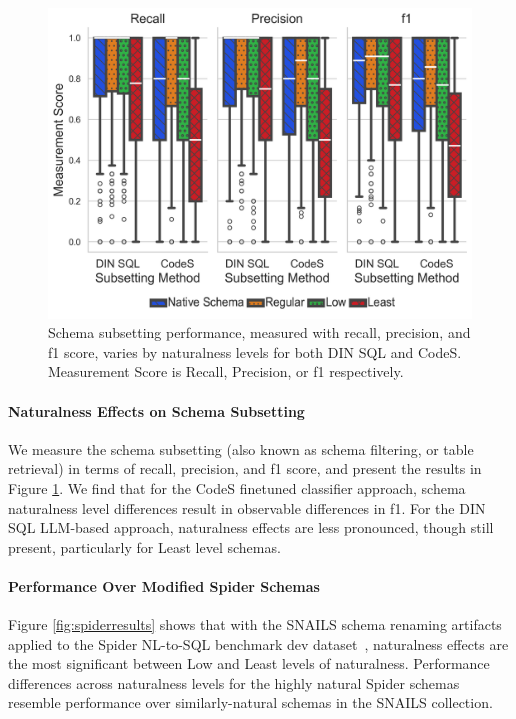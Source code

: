 \begin{figure}
  \centering
  \includegraphics[width=\figwidthmod\linewidth]{figures/dinsql_codes_subsetting_performance.png}
  \caption{Schema subsetting performance, measured with recall, precision, and  f1 score, varies by naturalness levels for both DIN SQL and CodeS. Measurement Score is Recall, Precision, or f1 respectively.}
  \label{fig:subsettingperformance}
\end{figure}

\paragraph{\textbf{Naturalness Effects on Schema Subsetting}}
We measure the schema subsetting (also known as schema filtering, or table retrieval) in terms of recall, precision, and f1 score, and present the results in Figure \ref{fig:subsettingperformance}.
We find that for the CodeS finetuned classifier approach, schema naturalness level differences result in observable differences in f1.
For the DIN SQL LLM-based approach, naturalness effects are less pronounced, though still present, particularly for Least level schemas.

\paragraph{\textbf{Performance Over Modified Spider Schemas}}
Figure \ref{fig:spiderresults} shows that with the SNAILS schema renaming artifacts applied to the Spider NL-to-SQL benchmark dev dataset~\cite{Yu&al.18c}, naturalness effects are the most significant between Low and Least levels of naturalness.
Performance differences across naturalness levels for the highly natural Spider schemas resemble performance over similarly-natural schemas in the SNAILS collection.

